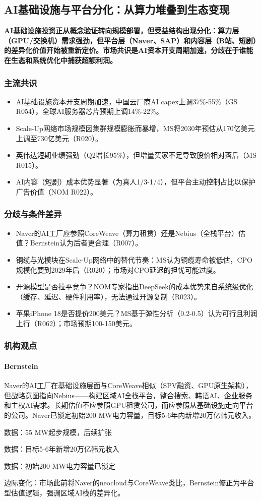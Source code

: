 \documentclass[11pt]{ctexart}
\begin{document}
\subsection{AI基础设施与平台分化：从算力堆叠到生态变现}
\textbf{AI基础设施投资正从概念验证转向规模部署，但受益结构出现分化：算力层（GPU/交换机）需求强劲，但平台层（Naver、SAP）和内容层（B站、短剧）的差异化价值开始被重新定价。市场共识是AI资本开支周期加速，分歧在于谁能在生态和系统优化中捕获超额利润。}
\subsubsection*{主流共识}
\begin{itemize}
  \item AI基础设施资本开支周期加速，中国云厂商AI capex上调37\%-55\%（GS R054），全球AI服务器芯片预期上调14\%-22\%。
  \item Scale-Up网络市场规模因集群规模膨胀而暴增，MS将2030年预估从170亿美元上调至730亿美元（R020）。
  \item 英伟达短期业绩强劲（Q2增长95\%），但增量买家不足导致股价相对落后（MS R015）。
  \item AI内容（短剧）成本优势显著（为真人1/3-1/4），但平台主动控制占比以保护广告价值（NOM R022）。
\end{itemize}
\subsubsection*{分歧与条件差异}
\begin{itemize}
  \item Naver的AI工厂应参照CoreWeave（算力租赁）还是Nebius（全栈平台）估值？Bernstein认为后者更合理（R007）。
  \item 铜缆与光模块在Scale-Up网络中的替代节奏：MS认为铜缆寿命被低估，CPO规模化要到2029年后（R020）；市场对CPO延迟的担忧可能过度。
  \item 开源模型是否拉平竞争？NOM专家指出DeepSeek的成本优势来自系统级优化（缓存、延迟、硬件利用率），无法通过开源复制（R023）。
  \item 苹果iPhone 18是否提价200美元？MS基于弹性分析（0.2-0.5）认为可行且利润上行（R062）；市场预期100-150美元。
\end{itemize}
\subsubsection*{机构观点}
\paragraph{Bernstein} Naver的AI工厂在基础设施层面与CoreWeave相似（SPV融资、GPU原生架构），但战略意图指向Nebius——构建区域AI全栈平台，整合搜索、韩语AI、企业服务和主权AI需求。长期估值不应参照GPU租赁公司，而应参照从基础设施走向平台的公司。Naver已锁定初始200 MW电力容量，目标5-6年内新增20万亿韩元收入。
{\small\color{refgray}数据：55 MW起步规模，后续扩张\par}
{\small\color{refgray}数据：目标5-6年新增20万亿韩元收入\par}
{\small\color{refgray}数据：初始200 MW电力容量已锁定\par}
{\small\color{refgray}边际变化：市场此前将Naver的neocloud与CoreWeave类比，Bernstein修正为平台型估值逻辑，强调区域AI栈的差异化。\par}
\end{document}
